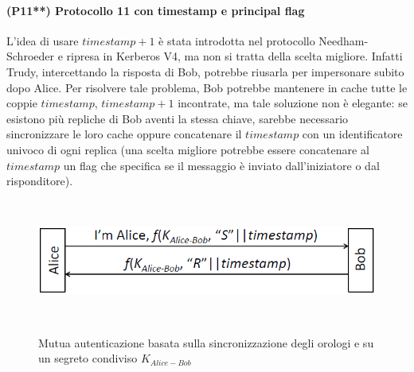 \paragraph{(P11**) Protocollo 11 con timestamp e principal flag}
L'idea di usare $timestamp + 1$ è stata introdotta nel protocollo Needham-Schroeder e ripresa in Kerberos V4, ma non si tratta della scelta migliore. Infatti Trudy, intercettando la risposta di Bob, potrebbe riusarla per impersonare subito dopo Alice. Per risolvere tale problema, Bob potrebbe mantenere in cache tutte le coppie $timestamp$, $timestamp + 1$ incontrate, ma tale soluzione non è elegante: se esistono più repliche di Bob aventi la stessa chiave, sarebbe necessario sincronizzare le loro cache oppure concatenare il $timestamp$ con un identificatore univoco di ogni replica (una scelta migliore potrebbe essere concatenare al $timestamp$ un flag che specifica se il messaggio è inviato dall'iniziatore o dal risponditore).
\begin{figure}[htbp]
	\centering%
	\subfigure%
	{\includegraphics[height=4cm, width=12cm, keepaspectratio]{Immagini/autenticazione/ImgS56bis.png}}
	\caption{Mutua autenticazione basata sulla sincronizzazione degli orologi e su un segreto condiviso $K_{Alice-Bob}$}\label{fig:ImgS56bis} 	
\end{figure}
